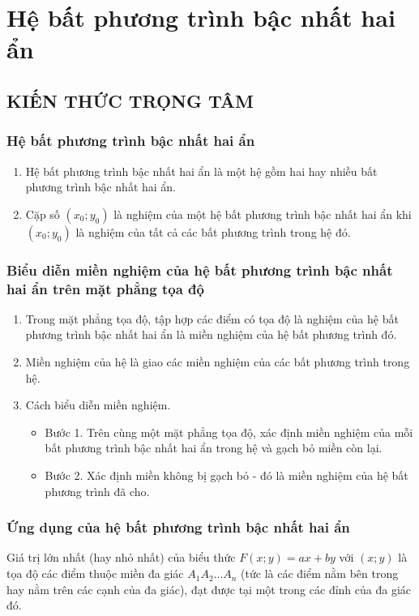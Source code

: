 \newpage
\def\tenchude{HỆ BẤT PHƯƠNG TRÌNH BẬC NHẤT HAI ẨN}
\setcounter{section}{3}
\setcounter{dang}{0}
\section{Hệ bất phương trình bậc nhất hai ẩn}
\subsection{KIẾN THỨC TRỌNG TÂM}
\subsubsection{Hệ bất phương trình bậc nhất hai ẩn}
\begin{enumerate}
	\item Hệ bất phương trình bậc nhất hai ẩn là một hệ gồm hai hay nhiều bất phương trình bậc nhất hai ẩn.
	\item Cặp số $ (x_0;y_0) $ là nghiệm của một hệ bất phương trình bậc nhất hai ẩn khi $ (x_0;y_0) $ là nghiệm của tất cả các bất phương trình trong hệ đó.
\end{enumerate}
\subsubsection{Biểu diễn miền nghiệm của hệ bất phương trình bậc nhất hai ẩn trên mặt phẳng tọa độ}
\begin{enumerate}
	\item Trong mặt phẳng tọa độ, tập hợp các điểm có tọa độ là nghiệm của hệ bất phương trình bậc nhất hai ẩn là miền nghiệm của hệ bất phương trình đó.
	\item Miền nghiệm của hệ là giao các miền nghiệm của các bất phương trình trong hệ.
	\item Cách biểu diễn miền nghiệm.
	\begin{itemize}
		\item Bước 1. Trên cùng một mặt phẳng tọa độ, xác định miền nghiệm của mỗi bất phương trình bậc nhất hai ẩn trong hệ và gạch bỏ miền còn lại.
		\item Bước 2. Xác định miền không bị gạch bỏ - đó là miền nghiệm của hệ bất phương trình đã cho.
	\end{itemize}
\end{enumerate}
\subsubsection{Ứng dụng của hệ bất phương trình bậc nhất hai ẩn}
Giá trị lớn nhất (hay nhỏ nhất) của biểu thức $ F(x;y)=ax+by $ với $ (x;y) $ là tọa độ các điểm thuộc miền đa giác $ A_1A_2...A_n $ (tức là các điểm nằm bên trong hay nằm trên các cạnh của đa giác), đạt được tại một trong các đỉnh của đa giác đó.
